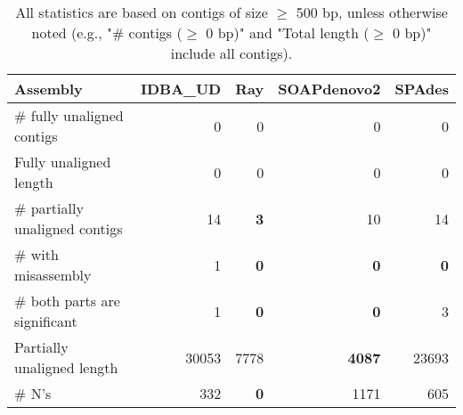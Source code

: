 \documentclass[12pt,a4paper]{article}
\begin{document}
\begin{table}[ht]
\begin{center}
\caption{All statistics are based on contigs of size $\geq$ 500 bp, unless otherwise noted (e.g., "\# contigs ($\geq$ 0 bp)" and "Total length ($\geq$ 0 bp)" include all contigs).}
\begin{tabular}{|l*{4}{|r}|}
\hline
Assembly & IDBA\_UD & Ray & SOAPdenovo2 & SPAdes \\ \hline
\# fully unaligned contigs & 0 & 0 & 0 & 0 \\ \hline
Fully unaligned length & 0 & 0 & 0 & 0 \\ \hline
\# partially unaligned contigs & 14 & {\bf 3} & 10 & 14 \\ \hline
\hspace{5mm}\# with misassembly & 1 & {\bf 0} & {\bf 0} & {\bf 0} \\ \hline
\hspace{5mm}\# both parts are significant & 1 & {\bf 0} & {\bf 0} & 3 \\ \hline
Partially unaligned length & 30053 & 7778 & {\bf 4087} & 23693 \\ \hline
\# N's & 332 & {\bf 0} & 1171 & 605 \\ \hline
\end{tabular}
\end{center}
\end{table}
\end{document}
